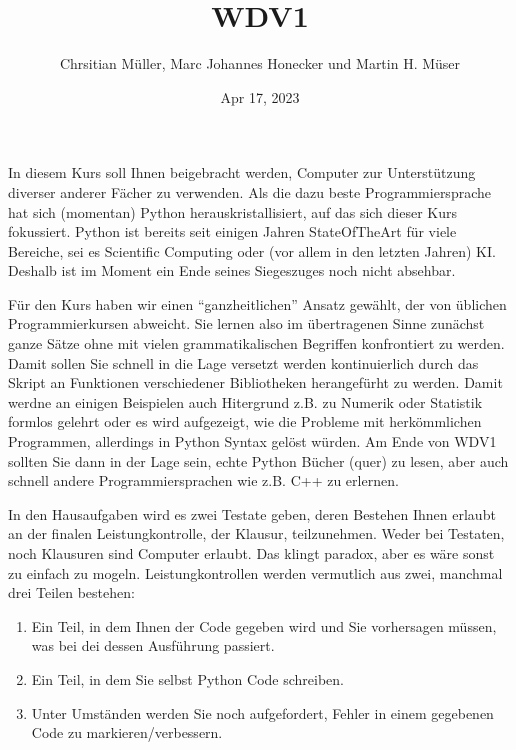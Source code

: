 \documentclass[letterpaper,10pt,english]{jupyterBook}
\title{WDV1}
\date{Apr 17, 2023}
\author{Chrsitian Müller, Marc Johannes Honecker und Martin H.\@{} Müser}
\begin{document}
\pagestyle{empty}
\sphinxmaketitle
\pagestyle{plain}
\sphinxtableofcontents
\pagestyle{normal}
\label{\detokenize{intro::doc}}


\sphinxAtStartPar
In diesem Kurs soll Ihnen beigebracht werden, Computer zur Unterstützung diverser anderer Fächer zu verwenden. Als die dazu beste
Programmiersprache hat sich (momentan) Python herauskristallisiert, auf das sich dieser Kurs fokussiert. Python ist bereits seit
einigen Jahren State\sphinxhyphen{}Of\sphinxhyphen{}The\sphinxhyphen{}Art für viele Bereiche, sei es Scientific Computing oder (vor allem in den letzten Jahren) KI.
Deshalb ist im Moment ein Ende seines Siegeszuges noch nicht absehbar.

\sphinxAtStartPar
Für den Kurs haben wir einen “ganzheitlichen” Ansatz gewählt, der von üblichen Programmierkursen abweicht. Sie lernen also im
übertragenen Sinne zunächst ganze Sätze ohne mit vielen grammatikalischen Begriffen konfrontiert zu werden. Damit sollen Sie
schnell in die Lage versetzt werden kontinuierlich durch das Skript an Funktionen verschiedener Bibliotheken herangefürht zu
werden. Damit werdne an einigen Beispielen auch Hitergrund z.B. zu Numerik oder Statistik formlos gelehrt oder es wird aufgezeigt,
wie die Probleme mit herkömmlichen Programmen, allerdings in Python Syntax gelöst würden. Am Ende von WDV\sphinxhyphen{}1 sollten Sie dann in
der Lage sein, echte Python Bücher (quer) zu lesen, aber auch schnell andere Programmiersprachen wie z.B. C++ zu erlernen.

\sphinxAtStartPar
In den Hausaufgaben wird es zwei Testate geben, deren Bestehen Ihnen erlaubt an der finalen Leistungkontrolle, der Klausur,
teilzunehmen. Weder bei Testaten, noch Klausuren sind Computer erlaubt. Das klingt paradox, aber es wäre sonst zu einfach zu
mogeln. Leistungkontrollen werden vermutlich aus zwei, manchmal drei Teilen bestehen:
\begin{enumerate}
%
\item {} 
\sphinxAtStartPar
Ein Teil, in dem Ihnen der Code gegeben wird und Sie vorhersagen müssen, was bei dei dessen Ausführung passiert.

\item {} 
\sphinxAtStartPar
Ein Teil, in dem Sie selbst Python Code schreiben.

\item {} 
\sphinxAtStartPar
Unter Umständen werden Sie noch aufgefordert, Fehler in einem gegebenen Code zu markieren/verbessern.

\end{enumerate}
\end{document}
